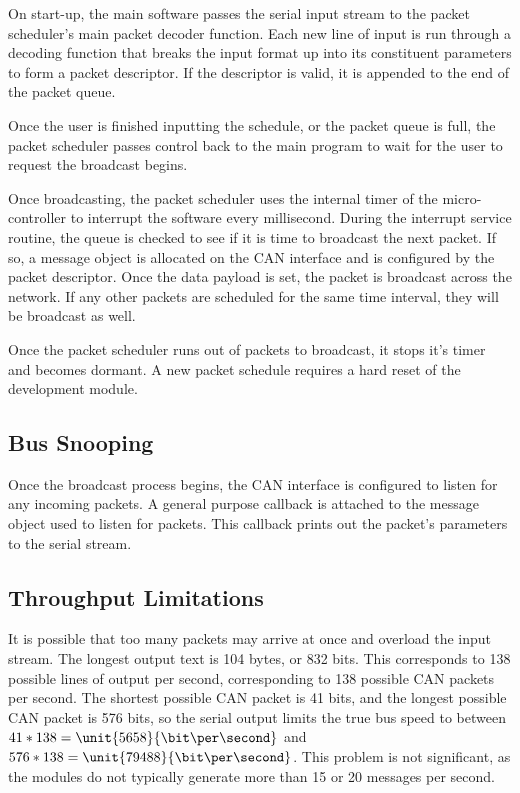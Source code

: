 On start-up, the main software passes the serial input stream to the packet scheduler's main packet decoder function. Each new line of input is run through a decoding function that breaks the input format up into its constituent parameters to form a packet descriptor. If the descriptor is valid, it is appended to the end of the packet queue.

Once the user is finished inputting the schedule, or the packet queue is full, the packet scheduler passes control back to the main program to wait for the user to request the broadcast begins.

Once broadcasting, the packet scheduler uses the internal timer of the micro-controller to interrupt the software every millisecond. During the interrupt service routine, the queue is checked to see if it is time to broadcast the next packet. If so, a message object is allocated on the CAN interface and is configured by the packet descriptor. Once the data payload is set, the packet is broadcast across the network. If any other packets are scheduled for the same time interval, they will be broadcast as well. 

Once the packet scheduler runs out of packets to broadcast, it stops it's timer and becomes dormant. A new packet schedule requires a hard reset of the development module.

\subsection{Bus Snooping}

Once the broadcast process begins, the CAN interface is configured to listen for any incoming packets. A general purpose callback is attached to the message object used to listen for packets. This callback prints out the packet's parameters to the serial stream. 

\subsection{Throughput Limitations}

It is possible that too many packets may arrive at once and overload the input stream. The longest output text is 104 bytes, or 832 bits. This corresponds to 138 possible lines of output per second, corresponding to 138 possible CAN packets per second. The shortest possible CAN packet is 41 bits, and the longest possible CAN packet is 576 bits, so the serial output limits the true bus speed to between $41*138 = \unit{5658}{\bit\per\second}$ and $576 * 138 = \unit{79488}{\bit\per\second}$. This problem is not significant, as the modules do not typically generate more than 15 or 20 messages per second.

